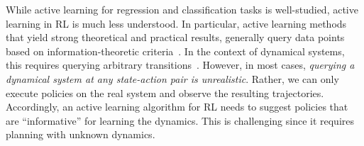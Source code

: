 While active learning for regression and classification tasks is well-studied, active learning in RL is much less understood.
    In particular, active learning methods that yield strong theoretical and practical results, generally query data points based on information-theoretic criteria~\citep{krause2008near,settles2009active, balcan2010true,hanneke2014theory, chen15mis}. In the context of dynamical systems, this requires querying arbitrary transitions~\citep{berkenkamp2017safe, mehta2021experimental}.
    However, in most cases, \emph{querying a dynamical system at any state-action pair is unrealistic}. Rather, we can only execute policies on the real system and observe the resulting trajectories. Accordingly, an active learning algorithm for RL needs to suggest policies that are ``informative'' for learning the dynamics. This is challenging since it requires planning with unknown dynamics. %
    
